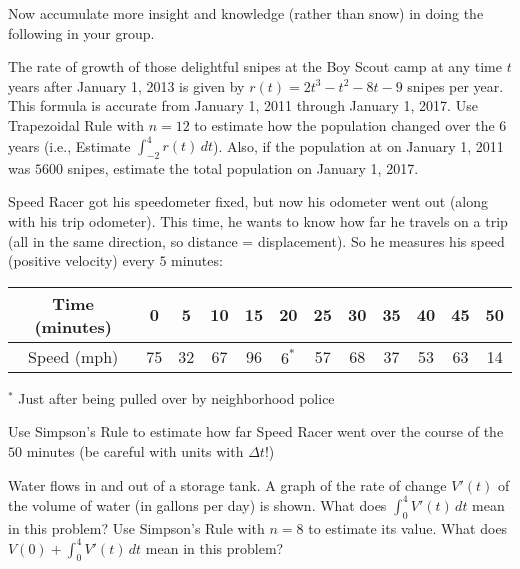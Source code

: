 \documentclass{ximera}
\begin{document}
Now accumulate more insight and knowledge (rather than snow) in doing the following in your group.
\begin{exercise}
The rate of growth of those delightful snipes at the Boy Scout camp at any time $t$ years after January 1, 2013 is given by $r(t) = 2t^3-t^2-8t-9$ snipes per year.  This formula is accurate from January 1, 2011 through January 1, 2017.  Use Trapezoidal Rule with $n = 12$ to estimate how the population changed over the $6$ years (i.e., Estimate $\int_{-2}^4 r(t)\, dt$).  Also, if the population at on January 1, 2011 was $5600$ snipes, estimate the total population on January 1, 2017.  

\end{exercise}


\begin{exercise}
Speed Racer got his speedometer fixed, but now his odometer went out (along with his trip odometer).  This time, he wants to know how far he travels on a trip (all in the same direction, so distance = displacement).  So he measures his speed (positive velocity) every $5$ minutes:
\begin{center}
    \begin{tabular}{|c|c|c|c|c|c|c|c|c|c|c|c|} \hline
        Time (minutes) & 0&5&10&15&20&25&30&35&40&45&50  \\ \hline
        Speed (mph) & 75&32&67&96&$6^\ast$&57&68&37&53& 63&14 \\ \hline
    \end{tabular}
\end{center}
$^\ast$ Just after being pulled over by neighborhood police

Use Simpson's Rule to estimate how far Speed Racer went over the course of the $50$ minutes (be careful with units with $\Delta t$!)
\end{exercise}

\begin{exercise}
Water flows in and out of a storage tank.  A graph of the rate of change $V'(t)$ of the volume of water (in gallons per day) is shown.  What does $\int_0^4 V'(t)\, dt$ mean in this problem?  Use Simpson’s Rule with $n = 8$ to estimate its value.  What does $V(0) + \int_0^4 V'(t)\, dt$ mean in this problem?

\begin{center}
\end{center}


\end{exercise}
\end{document}
